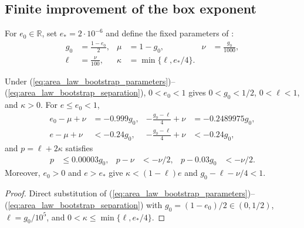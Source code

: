 \subsection{Finite improvement of the box exponent}
\label{sec:area_law_exponent_bootstrap}

\begin{definition}
    \label{def:area_law_bootstrap_parameters}
    \leanok
    For $e_0\in\mathbb R$, set $e_*=2\cdot10^{-6}$ and define the fixed
    parameters of \cite[Proposition~9.5]{OpenAI2026AreaLaw}:
    \begin{align}
        g_0  & =\frac{1-e_0}{2}, & \mu    & =1-g_0,              & \nu & =\frac{g_0}{1000},
        \label{eq:area_law_bootstrap_parameters}                                            \\
        \ell & =\frac{\nu}{100}, & \kappa & =\min\{\ell,e_*/4\}.
        \label{eq:area_law_bootstrap_separation}
    \end{align}
\end{definition}

\begin{lemma}
    \label{thm:area_law_bootstrap_margins}
    \leanok
    Under (\ref{eq:area_law_bootstrap_parameters})--(\ref{eq:area_law_bootstrap_separation}),
    $0<e_0<1$ gives $0<g_0<1/2$, $0<\ell<1$, and $\kappa>0$. For $e\le e_0<1$,
    \begin{align}
        e_0-\mu+\nu & =-0.999g_0,
                    & -\frac{g_0-\ell}{4}+\nu & =-0.2489975g_0,
        \label{eq:area_law_bootstrap_density_values}            \\
        e-\mu+\nu   & <-0.24g_0,
                    & -\frac{g_0-\ell}{4}+\nu & <-0.24g_0,
        \label{eq:area_law_bootstrap_density_margin}
    \end{align}
    and $p=\ell+2\kappa$ satisfies
    \begin{align}
        p & \le0.00003g_0, & p-\nu & <-\nu/2, & p-0.03g_0 & <-\nu/2.
        \label{eq:area_law_bootstrap_energy_margin}
    \end{align}
    Moreover, $e_0>0$ and $e>e_*$ give $\kappa<(1-\ell)e$ and $g_0-\ell-\nu/4<1$.
\end{lemma}
\begin{proof}\leanok
    Direct substitution of (\ref{eq:area_law_bootstrap_parameters})--(\ref{eq:area_law_bootstrap_separation})
    with $g_0=(1-e_0)/2\in(0,1/2)$, $\ell=g_0/10^5$, and $0<\kappa\le\min\{\ell,e_*/4\}$.
\end{proof}

